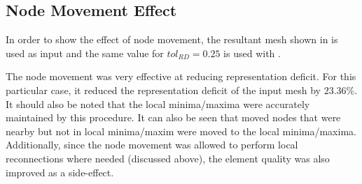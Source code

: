 \subsection{Node Movement Effect}
In order to show the effect of node movement, the resultant mesh shown
in  is used as input and the same value for
$tol_{RD} = 0.25$ is used with .

\begin{figure}[h!]
  \begin{center}
  \label{fig_NodeSmoothing}
 

  \end{center}
\end{figure}

The node movement was very effective at reducing representation deficit.
For this particular case, it reduced the representation deficit of the
input mesh by $23.36\%$. It should also be noted that the local
minima/maxima were accurately maintained by this procedure. It can also
be seen that moved nodes that were nearby but not in local minima/maxim
were moved to the local minima/maxima. Additionally, since the node
movement was allowed to perform local reconnections where needed
(discussed above), the element quality was also improved as a
side-effect.

